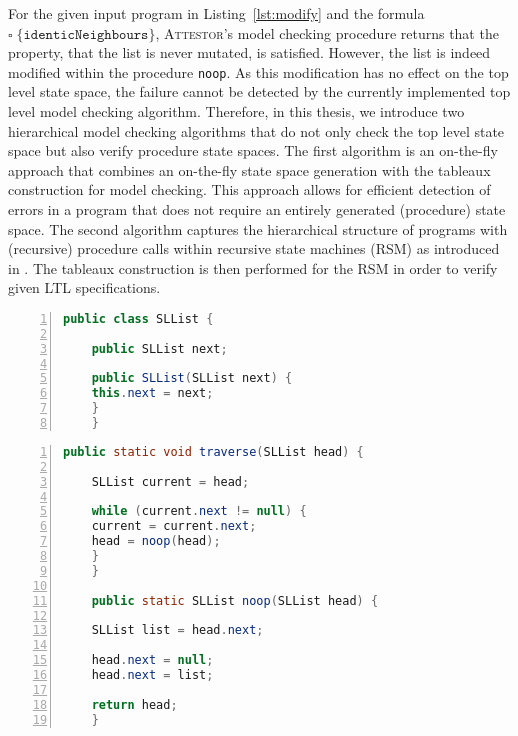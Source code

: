 \documentclass[a4paper, 12pt, twoside]{report}
\begin{document}
	For the given input program in Listing~\ref{lst:modify} and the formula $\square\;\{\texttt{identicNeighbours}\}$, \textsc{Attestor}'s model checking procedure returns that the property, that the list is never mutated, is satisfied. However, the list is indeed modified within the procedure \texttt{noop}. As this modification has no effect on the top level state space, the failure cannot be detected by the currently implemented top level model checking algorithm. Therefore, in this thesis, we introduce two hierarchical model checking algorithms that do not only check the top level state space but also verify procedure state spaces. The first algorithm is an on-the-fly approach that combines an on-the-fly state space generation with the tableaux construction for model checking. This approach allows for efficient detection of errors in a program that does not require an entirely generated (procedure) state space. The second algorithm captures the hierarchical structure of programs with (recursive) procedure calls within recursive state machines (RSM) as introduced in \cite{alur2001analysis}. The tableaux construction is then performed for the RSM in order to verify given LTL specifications.\\	
	
	\begin{lstlisting}[language=Java,numbers=left,
	stepnumber=1,autogobble=true,keywordstyle=\color{blue},frame=single,caption={\textsc{Java} class definition for singly-linked lists.},captionpos=b,label={lst:sll}]
	public class SLList {
	
	public SLList next;
	
	public SLList(SLList next) {	  	
	this.next = next;
	}
	}
	\end{lstlisting}	
	
	\begin{lstlisting}[language=Java,numbers=left,
	stepnumber=1,autogobble=true,keywordstyle=\color{blue},frame=single,caption={\textsc{Java} code for traversing a singly-linked list that contains erroneous behaviour in a called procedure.},captionpos=b,label={lst:modify}]	  
	public static void traverse(SLList head) {	
	
	SLList current = head;	
	
	while (current.next != null) {
	current = current.next;
	head = noop(head);
	}
	}
	
	public static SLList noop(SLList head) {
	
	SLList list = head.next;
	
	head.next = null;
	head.next = list;
	
	return head;
	}	
	\end{lstlisting}
	
\end{document}

